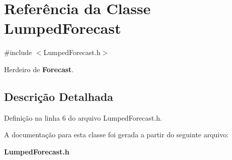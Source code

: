 \section{Referência da Classe Lumped\+Forecast}
\label{class_lumped_forecast}


{\ttfamily \#include $<$Lumped\+Forecast.\+h$>$}



Herdeiro de {\bf Forecast}.



\subsection{Descrição Detalhada}


Definição na linha 6 do arquivo Lumped\+Forecast.\+h.



A documentação para esta classe foi gerada a partir do seguinte arquivo\+:\begin{DoxyCompactItemize}
\item 
{\bf Lumped\+Forecast.\+h}\end{DoxyCompactItemize}
